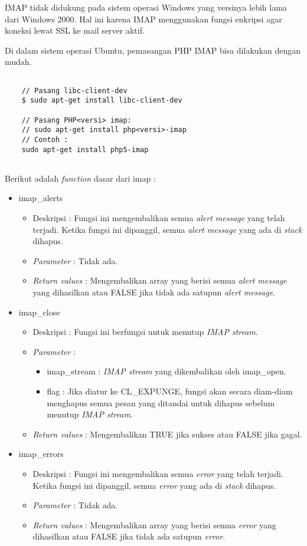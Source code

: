 IMAP tidak didukung pada sistem operasi Windows yang versinya lebih lama dari Windows 2000. Hal ini karena IMAP menggunakan fungsi enkripsi agar koneksi lewat SSL ke mail server aktif.

Di dalam sistem operasi Ubuntu, pemasangan PHP IMAP bisa dilakukan dengan mudah.
\begin{lstlisting}
	
	// Pasang libc-client-dev
	$ sudo apt-get install libc-client-dev

	// Pasang PHP<versi> imap:
	// sudo apt-get install php<versi>-imap
	// Contoh : 
	sudo apt-get install php5-imap
		
\end{lstlisting}

Berikut adalah \textit{function} dasar dari imap :
\begin{itemize}
\item imap\_alerts
\begin{itemize}
\item Deskripsi : Fungsi ini mengembalikan semua \textit{alert message} yang telah terjadi. Ketika fungsi ini dipanggil, semua \textit{alert message} yang ada di \textit{stack} dihapus.
\item \textit{Parameter} : Tidak ada.
\item \textit{Return values} : Mengembalikan array yang berisi semua \textit{alert message} yang dihasilkan atau FALSE jika tidak ada satupun \textit{alert message}.
\end{itemize}
 
\item imap\_close
\begin{itemize}
\item Deskripsi : Fungsi ini berfungsi untuk menutup \textit{IMAP stream}.
\item \textit{Parameter} :
\begin{itemize}
\item imap\_stream : \textit{IMAP stream} yang dikembalikan oleh imap\_open.
\item flag : Jika diatur ke CL\_EXPUNGE, fungsi akan secara diam-diam menghapus semua pesan yang ditandai untuk dihapus sebelum menutup \textit{IMAP stream}.
\end{itemize}
\item \textit{Return values} : Mengembalikan TRUE jika sukses atau FALSE jika gagal.
\end{itemize}
 
\item imap\_errors
\begin{itemize}
\item Deskripsi : Fungsi ini mengembalikan semua \textit{error} yang telah terjadi. Ketika fungsi ini dipanggil, semua \textit{error} yang ada di \textit{stack} dihapus.
\item \textit{Parameter} : Tidak ada.
\item \textit{Return values} : Mengembalikan array yang berisi semua \textit{error} yang dihasilkan atau FALSE jika tidak ada satupun \textit{error}.
\end{itemize}
 

\end{itemize}
